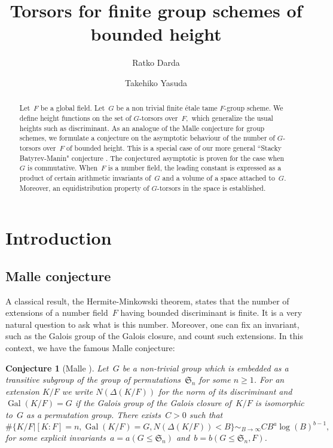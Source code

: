 \documentclass[a4paper,english,12pt]{amsart}
\title{Torsors for finite group schemes of bounded height}
\author[Darda]{Ratko Darda}
\author[Yasuda]{Takehiko Yasuda}
\newcommand{\Akk}{\mathfrak A_4}
\newcommand{\Fv}{F_v}
\newcommand{\vMF}{v\in M_F}
\DeclareMathOperator{\Gal}{Gal}
\newtheorem{conj}[equation]{Conjecture}
\numberwithin{equation}{subsection}
\begin{document}
\begin{abstract}
Let~$F$ be a global field. Let~$G$ be a non trivial finite \' etale tame $F$-group scheme. We define height functions on the set of $G$-torsors over~$F,$ which generalize the usual heights such as discriminant. As an analogue of the Malle conjecture for group schemes, we formulate a conjecture on the asymptotic behaviour of the number of $G$-torsors over~$F$ of bounded height. This is a special case of our more general ``Stacky Batyrev-Manin" conjecture \cite{dardayasudabm}. The conjectured asymptotic is proven for the case when~$G$ is commutative. When~$F$ is a number field, the leading constant is expressed as a product of certain arithmetic invariants of~$G$ and a volume of a space attached to~$G$. Moreover, an equidistribution property of $G$-torsors in the space is established. %
\end{abstract}
\maketitle
\section{Introduction}
\subsection{Malle conjecture} A classical result, the Hermite-Minkowski theorem, states that the number of extensions of a number field~$F$ having bounded discriminant is finite. It is a very natural question to ask what is this number. Moreover, one can fix  an invariant, such as the Galois group of the Galois closure, and count such extensions. In this context, we have the famous Malle conjecture:
\begin{conj}[{Malle \cite{Malle}}] \label{classmalle}
Let~$G$ be a non-trivial group which is embedded as a transitive subgroup of the group of permutations~$\mathfrak S_n$ for some $n\geq 1$. For an extension $K/F$ we write $N(\Delta(K/F))$ for the norm of its discriminant and $\Gal(K/F)=G$ if the Galois group of the Galois closure of~$K/F$ is isomorphic to~$G$ as a permutation group. There exists~$C>0$ such that
\begin{equation*}\#\{K/F|[K:F]=n, \Gal(K/F)=G, N(\Delta(K/F))<B\} \sim_{B\to\infty} C B^a\log(B)^{b-1},\end{equation*}
for some explicit invariants~$a=a(G\leq \mathfrak S_n)$ and~$b=b(G\leq \mathfrak S_n, F)$.
\end{conj}
\end{document}
